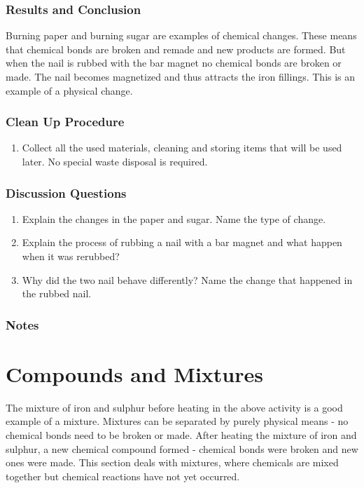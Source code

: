 \subsubsection*{Results and Conclusion}
Burning paper and burning sugar are examples of chemical changes. These means that chemical bonds are broken and remade and new products are formed. But when the nail is rubbed with the bar magnet no chemical bonds are broken or made. The nail becomes magnetized and thus attracts the iron fillings. This is an example of a physical change.

\subsubsection*{Clean Up Procedure}
\begin{enumerate}
\item{Collect all the used materials, cleaning and storing items that will be used later. No special waste disposal is required.}
\end{enumerate}

\subsubsection*{Discussion Questions}
\begin{enumerate}
\item{Explain the changes in the paper and sugar. Name the type of change.}
\item{Explain the process of rubbing a nail with a bar magnet and what happen when it was rerubbed?}
\item{Why did the two nail behave differently? Name the change that happened in the rubbed nail.}
\end{enumerate}

\subsubsection*{Notes}

\section{Compounds and Mixtures}

The mixture of iron and sulphur before heating in the above activity is a good example of a mixture. Mixtures can be separated by purely physical means - no chemical bonds need to be broken or made. After heating the mixture of iron and sulphur, a new chemical compound formed - chemical bonds were broken and new ones were made. This section deals with mixtures, where chemicals are mixed together but chemical reactions have not yet occurred.

